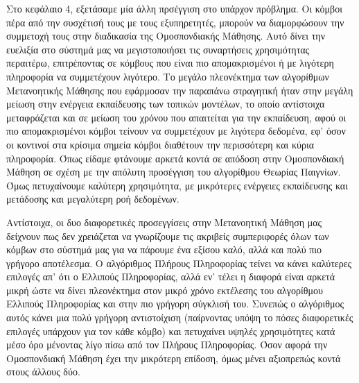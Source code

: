 Στο κεφάλαιο 4, εξετάσαμε μία άλλη πρσέγγιση στο υπάρχον πρόβλημα. Οι κόμβοι πέρα από την συσχέτισή τους με τους εξυπηρετητές, μπορούν να διαμορφώσουν την συμμετοχή τους στην διαδικασία της Ομοσπονδιακής Μάθησης. Αυτό δίνει την ευελιξία στο σύστημά μας να μεγιστοποιήσει τις συναρτήσεις χρησιμότητας περαιτέρω, επιτρέποντας σε κόμβους που είναι πιο απομακρισμένοι ή με λιγότερη πληροφορία να συμμετέχουν λιγότερο. Το μεγάλο πλεονέκτημα των αλγορίθμων Μετανοητικής Μάθησης που εφάρμοσαν την παραπάνω στραγητική ήταν στην μεγάλη μείωση στην ενέργεια εκπαίδευσης των τοπικών μοντέλων, το οποίο αντίστοιχα μεταφράζεται και σε μείωση του χρόνου που απαιτείται για την εκπαίδευση, αφού οι πιο απομακρισμένοι κόμβοι τείνουν να συμμετέχουν με λιγότερα δεδομένα, εφ' όσον οι κοντινοί στα κρίσιμα σημεία κόμβοι διαθέτουν την περισσότερη και κύρια πληροφορία. Όπως είδαμε φτάνουμε αρκετά κοντά σε απόδοση στην Ομοσπονδιακή Μάθηση σε σχέση με την απόλυτη προσέγγιση του αλγορίθμου Θεωρίας Παιγνίων. Όμως πετυχαίνουμε καλύτερη χρησιμότητα, με μικρότερες ενέργειες εκπαίδευσης και μετάδοσης και μεγαλύτερη ροή δεδομένων.

Αντίστοιχα, οι δυο διαφορετικές προσεγγίσεις στην Μετανοητική Μάθηση μας δείχνουν πως δεν χρειάζεται να γνωρίζουμε τις ακριβείς συμπεριφορές όλων των κόμβων στο σύστημά μας για να πάρουμε ένα εξίσου καλό, αλλά και πολύ πιο γρήγορο αποτέλεσμα. Ο αλγόριθμος Πλήρους Πληροφορίας τείνει να κάνει καλύτερες επιλογές απ' ότι ο Ελλιπούς Πληροφορίας, αλλά εν' τέλει η διαφορά είναι αρκετά μικρή ώστε να δίνει πλεονέκτημα στον μικρό χρόνο εκτέλεσης του αλγορίθμου Ελλιπούς Πληροφορίας και στην πιο γρήγορη σύγκλισή του. Συνεπώς ο αλγόριθμος αυτός κάνει μια πολύ γρήγορη αντιστοίχιση (παίρνοντας υπόψη το πόσες διαφορετικές επιλογές υπάρχουν για τον κάθε κόμβο) και πετυχαίνει υψηλές χρησιμότητες κατά μέσο όρο μένοντας λίγο πίσω από τον Πλήρους Πληροφορίας. Όσον αφορά την Ομοσπονδιακή Μάθηση έχει την μικρότερη επίδοση, όμως μένει αξιοπρεπώς κοντά στους άλλους δύο.

